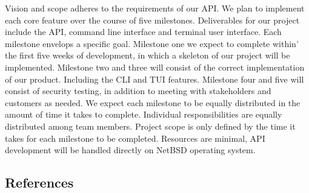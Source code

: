 Vision and scope adheres to the requirements of our API. We plan to implement each core feature over the course of five milestones. 
Deliverables for our project include the API, command line interface and terminal user interface. Each milestone envelops a 
specific goal. Milestone one we expect to complete within’ the first five weeks of development, in which a skeleton of our project 
will be implemented. Milestone two and three will consist of the correct implementation of our product. Including the CLI and TUI features. 
Milestone four and five will consist of security testing, in addition to meeting with stakeholders and customers as needed. We expect each 
milestone to be equally distributed in the amount of time it takes to complete. Individual responsibilities are equally distributed among 
team members. Project scope is only defined by the time it takes for each milestone to be completed. Resources are minimal, API development 
will be handled directly on NetBSD operating system. 

\subsection{References}


